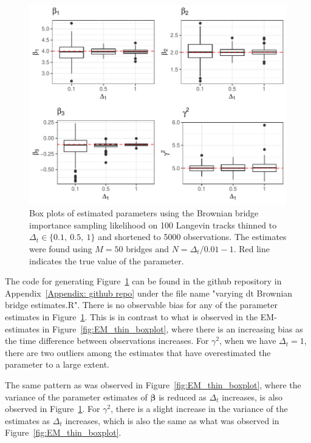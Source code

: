 \begin{figure}[H]
    \centering
    \includegraphics[width=\linewidth]{Images/Results/varying dt plot brownian bridge likelihood.pdf}
    \caption[Box plots of Parameter Estimates using Brownian bridge importance sampling at different sampling intervals]{Box plots of estimated parameters using the Brownian bridge importance sampling likelihood on 100 Langevin tracks thinned to $\Delta_t \in \{0.1, \ 0.5, \ 1\}$ and shortened to 5000 observations. The estimates were found using $M=50$ bridges and $N = \Delta_t/0.01 -1$. Red line indicates the true value of the parameter.}
    \label{fig:varying dt boxplot BB}
\end{figure}

The code for generating Figure~\ref{fig:varying dt boxplot BB} can be found in the github repository in Appendix~\ref{Appendix: github repo} under the file name "varying dt Brownian bridge estimates.R". There is no observable bias for any of the parameter estimates in Figure~\ref{fig:varying dt boxplot BB}. This is in contrast to what is observed in the EM-estimates in Figure~\ref{fig:EM_thin_boxplot}, where there is an increasing bias as the time difference between observations increases. For $\gamma^2$, when we have $\Delta_t=1$, there are two outliers among the estimates that have overestimated the parameter to a large extent. 

The same pattern as was observed in Figure~\ref{fig:EM_thin_boxplot}, where the variance of the parameter estimates of $\bm \beta$ is reduced as $\Delta_t$ increases, is also observed in Figure~\ref{fig:varying dt boxplot BB}. For $\gamma^2$, there is a slight increase in the variance of the estimates as $\Delta_t$ increases, which is also the same as what was observed in Figure~\ref{fig:EM_thin_boxplot}.




